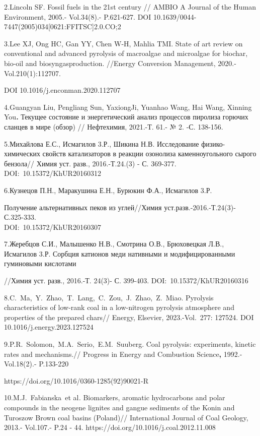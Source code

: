 2.Lincoln SF. Fossil fuels in the 21st century // AMBIO A Journal of the
Human Environment, 2005.- Vol.34(8).- P.621-627. DOI
10.1639/0044-7447(2005)034{[}0621:FFITSC{]}2.0.CO;2

3.Lee XJ, Ong HC, Gan YY, Chen W-H, Mahlia TMI. State of art review on
conventional and advanced pyrolysis of macroalgae and microalgae for
biochar, bio-oil and biosyngasproduction. //Energy Conversion
Management, 2020.-Vol.210(1):112707.

DOI 10.1016/j.enconman.2020.112707

4.Guangyan Liu, Pengliang Sun, YaxiongJi, Yuanhao Wang, Hai Wang,
Xinning You\textbf{.} Текущее состояние и энергетический анализ
процессов пиролиза горючих сланцев в мире (обзор) // Нефтехимия,
2021.-Т. 61.- № 2. -С. 138-156.

5.Михайлова Е.С., Исмагилов 3.Р., Шикина Н.В. Исследование
физико-химических свойств катализаторов в реакции озонолиза
каменноугольного сырого бензола// Химия уст. разв., 2016.-Т.24.(3) - С.
369-377. DOI:~10.15372/KhUR20160312

6.Кузнецов П.Н., Маракушина Е.Н., Бурюкин Ф.А., Исмагилов 3.Р.

Получение альтернативных пеков из углей//Химия уст.разв.-2016.-Т.24(3)-
С.325-333.\\
DOI:~10.15372/KhUR20160307

7.Жеребцов С.И., Малышенко Н.В., Смотрина О.В., Брюховецкая Л.В.,
Исмагилов 3.Р. Сорбция катионов меди нативными и модифицированными
гуминовыми кислотами

//Химия уст. разв., 2016.-Т. 24(3)- С. 399-403.
DOI:~10.15372/KhUR20160316

8.C.~Ma,~Y.~Zhao,~T.~Lang,~C.~Zou,~J.~Zhao,~Z.~Miao. Pyrolysis
characteristics of low-rank coal in a low-nitrogen pyrolysis atmosphere
and properties of the prepared chars// Energy, Elsevier, 2023.-Vol.~277:
127524. DOI 10.1016/j.energy.2023.127524

9.P.R.~Solomon,~M.A.~Serio,~E.M.~Suuberg. Coal pyrolysis: experiments,
kinetic rates and mechanisms.// Progress in Energy and Combustion
Science\textbf{,} 1992.-Vol.18(2).- P.133-220

https://doi.org/10.1016/0360-1285(92)90021-R

10.M.J.~Fabianska\emph{~}et al\emph{.} Biomarkers, aromatic hydrocarbons
and polar compounds in the neogene lignites and gangue sediments of the
Konin and Turoszow Brown coal basins (Poland)// International Journal of
Coal Geology, 2013.- Vol.107.- P.24 - 44.
https://doi.org/10.1016/j.coal.2012.11.008

